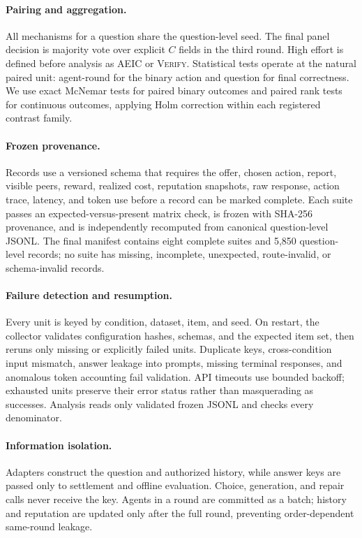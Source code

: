 \paragraph{Pairing and aggregation.}
All mechanisms for a question share the question-level seed. The final panel decision is majority vote over explicit $C$ fields in the third round. High effort is defined before analysis as \textsc{AEIC} or \textsc{Verify}. Statistical tests operate at the natural paired unit: agent-round for the binary action and question for final correctness. We use exact McNemar tests for paired binary outcomes and paired rank tests for continuous outcomes, applying Holm correction within each registered contrast family.

\paragraph{Frozen provenance.}
Records use a versioned schema that requires the offer, chosen action, report, visible peers, reward, realized cost, reputation snapshots, raw response, action trace, latency, and token use before a record can be marked complete. Each suite passes an expected-versus-present matrix check, is frozen with SHA-256 provenance, and is independently recomputed from canonical question-level JSONL. The final manifest contains eight complete suites and 5,850 question-level records; no suite has missing, incomplete, unexpected, route-invalid, or schema-invalid records.

\paragraph{Failure detection and resumption.}
Every unit is keyed by condition, dataset, item, and seed. On restart, the collector validates configuration hashes, schemas, and the expected item set, then reruns only missing or explicitly failed units. Duplicate keys, cross-condition input mismatch, answer leakage into prompts, missing terminal responses, and anomalous token accounting fail validation. API timeouts use bounded backoff; exhausted units preserve their error status rather than masquerading as successes. Analysis reads only validated frozen JSONL and checks every denominator.

\paragraph{Information isolation.}
Adapters construct the question and authorized history, while answer keys are passed only to settlement and offline evaluation. Choice, generation, and repair calls never receive the key. Agents in a round are committed as a batch; history and reputation are updated only after the full round, preventing order-dependent same-round leakage.
